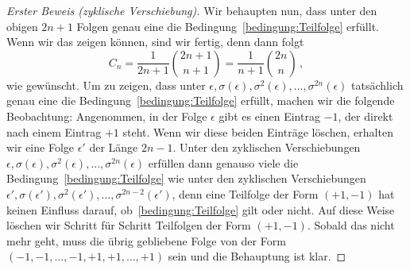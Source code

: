 \begin{proof}[Erster Beweis \textmd{(\emph{zyklische Verschiebung})}]
	Wir behaupten nun, dass unter den obigen $2n+1$ Folgen genau eine die Bedingung~\ref{bedingung:Teilfolge} erfüllt. Wenn wir das zeigen können, sind wir fertig, denn dann folgt
	\begin{equation*}
		C_n=\frac{1}{2n+1}\binom{2n+1}{n+1}=\frac{1}{n+1}\binom{2n}{n}\,,
	\end{equation*}
	wie gewünscht. Um zu zeigen, dass unter $\epsilon,\sigma(\epsilon),\sigma^2(\epsilon),\dotsc,\sigma^{2n}(\epsilon)$ tatsächlich genau eine die Bedingung~\ref{bedingung:Teilfolge} erfüllt, machen wir die folgende Beobachtung: Angenommen, in der Folge $\epsilon$ gibt es einen Eintrag $-1$, der direkt nach einem Eintrag $+1$ steht. Wenn wir diese beiden Einträge löschen, erhalten wir eine Folge $\epsilon'$ der Länge $2n-1$.  Unter den zyklischen Verschiebungen $\epsilon,\sigma(\epsilon),\sigma^2(\epsilon),\dotsc,\sigma^{2n}(\epsilon)$ erfüllen dann genauso viele die Bedingung~\ref{bedingung:Teilfolge} wie unter den zyklischen Verschiebungen $\epsilon',\sigma(\epsilon'),\sigma^2(\epsilon'),\dotsc,\sigma^{2n-2}(\epsilon')$, denn eine Teilfolge der Form $(+1,-1)$ hat keinen Einfluss darauf, ob~\ref{bedingung:Teilfolge} gilt oder nicht. Auf diese Weise löschen wir Schritt für Schritt Teilfolgen der Form $(+1,-1)$. Sobald das nicht mehr geht, muss die übrig gebliebene Folge von der Form $(-1,-1,\dotsc,-1,+1,+1,\dotsc,+1)$ sein und die Behauptung ist klar.
\end{proof}
